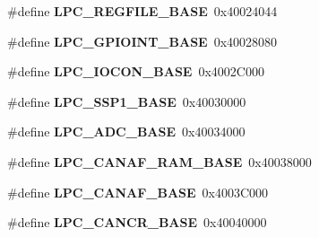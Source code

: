 \begin{DoxyCompactItemize}
\item 
\hypertarget{group___p_e_r_i_p_h__175_x__6_x___b_a_s_e_gad2674eff10cea9243ab060ad1fbac9d2}{\#define {\bfseries L\+P\+C\+\_\+\+R\+E\+G\+F\+I\+L\+E\+\_\+\+B\+A\+S\+E}~0x40024044}\label{group___p_e_r_i_p_h__175_x__6_x___b_a_s_e_gad2674eff10cea9243ab060ad1fbac9d2}

\item 
\hypertarget{group___p_e_r_i_p_h__175_x__6_x___b_a_s_e_gadf88491f4b83b5af99eaf30778cb62fa}{\#define {\bfseries L\+P\+C\+\_\+\+G\+P\+I\+O\+I\+N\+T\+\_\+\+B\+A\+S\+E}~0x40028080}\label{group___p_e_r_i_p_h__175_x__6_x___b_a_s_e_gadf88491f4b83b5af99eaf30778cb62fa}

\item 
\hypertarget{group___p_e_r_i_p_h__175_x__6_x___b_a_s_e_gae48aea115d5924805263d7a15402d4fa}{\#define {\bfseries L\+P\+C\+\_\+\+I\+O\+C\+O\+N\+\_\+\+B\+A\+S\+E}~0x4002\+C000}\label{group___p_e_r_i_p_h__175_x__6_x___b_a_s_e_gae48aea115d5924805263d7a15402d4fa}

\item 
\hypertarget{group___p_e_r_i_p_h__175_x__6_x___b_a_s_e_ga05d118997f53f596d3a087f8b91a1969}{\#define {\bfseries L\+P\+C\+\_\+\+S\+S\+P1\+\_\+\+B\+A\+S\+E}~0x40030000}\label{group___p_e_r_i_p_h__175_x__6_x___b_a_s_e_ga05d118997f53f596d3a087f8b91a1969}

\item 
\hypertarget{group___p_e_r_i_p_h__175_x__6_x___b_a_s_e_ga2396e0d0c565e4c1c3b2fc593bd6c37f}{\#define {\bfseries L\+P\+C\+\_\+\+A\+D\+C\+\_\+\+B\+A\+S\+E}~0x40034000}\label{group___p_e_r_i_p_h__175_x__6_x___b_a_s_e_ga2396e0d0c565e4c1c3b2fc593bd6c37f}

\item 
\hypertarget{group___p_e_r_i_p_h__175_x__6_x___b_a_s_e_ga9d4f2bac61e26b32ad64d62f2be50e49}{\#define {\bfseries L\+P\+C\+\_\+\+C\+A\+N\+A\+F\+\_\+\+R\+A\+M\+\_\+\+B\+A\+S\+E}~0x40038000}\label{group___p_e_r_i_p_h__175_x__6_x___b_a_s_e_ga9d4f2bac61e26b32ad64d62f2be50e49}

\item 
\hypertarget{group___p_e_r_i_p_h__175_x__6_x___b_a_s_e_gabc6943f9e943d63ecf4e236b4ce7c344}{\#define {\bfseries L\+P\+C\+\_\+\+C\+A\+N\+A\+F\+\_\+\+B\+A\+S\+E}~0x4003\+C000}\label{group___p_e_r_i_p_h__175_x__6_x___b_a_s_e_gabc6943f9e943d63ecf4e236b4ce7c344}

\item 
\hypertarget{group___p_e_r_i_p_h__175_x__6_x___b_a_s_e_gac22b88e108d620661add143c174f8f11}{\#define {\bfseries L\+P\+C\+\_\+\+C\+A\+N\+C\+R\+\_\+\+B\+A\+S\+E}~0x40040000}\label{group___p_e_r_i_p_h__175_x__6_x___b_a_s_e_gac22b88e108d620661add143c174f8f11}


\end{DoxyCompactItemize}
